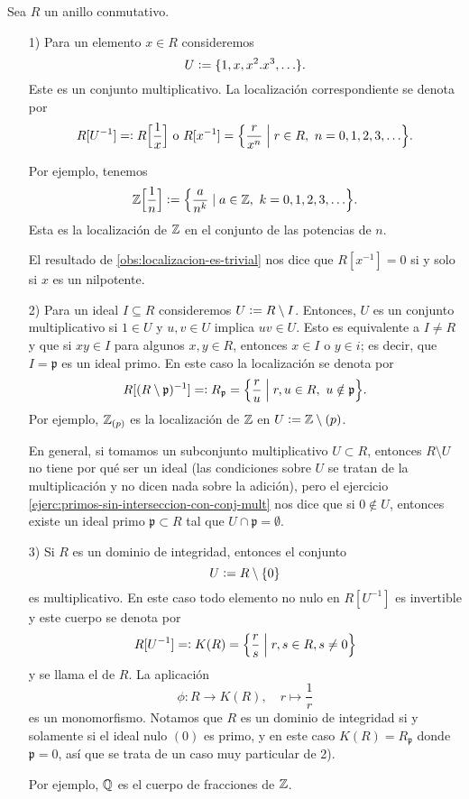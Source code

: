 \begin{ejemplo}
  Sea $R$ un anillo conmutativo.

  \begin{enumerate}
  \item[1)] Para un elemento $x\in R$ consideremos
    $$U \mathrel{\mathop:}= \{ 1,x,x^2.x^3, \ldots \}.$$
    Este es un conjunto multiplicativo. La localización correspondiente se
    denota por
    \[ R [U^{-1}] =\mathrel{\mathop:} R \Bigl[\frac{1}{x}\Bigr]\text{ o }R [x^{-1}] =
       \Bigl\{ \frac{r}{x^n} \Bigm| r\in R, ~ n = 0,1,2,3,\ldots \Bigr\}. \]

    Por ejemplo, tenemos
    \[ \mathbb{Z} \Bigl[\frac{1}{n}\Bigr] \mathrel{\mathop:}=
       \Bigl \{ \frac{a}{n^k} \mid a\in \mathbb{Z}, ~ k = 0,1,2,3,\ldots \Bigr\}. \]
    Esta es la localización de $\mathbb{Z}$ en el conjunto de las potencias de $n$.

    El resultado de \ref{obs:localizacion-es-trivial} nos dice que
    $R [x^{-1}] = 0$ si y solo si $x$ es un nilpotente.

  \item[2)] Para un ideal $I \subseteq R$ consideremos $U \mathrel{\mathop:}= R\setminus
    I$. Entonces, $U$ es un conjunto multiplicativo si $1 \in U$ y $u, v \in U$
    implica $uv\in U$. Esto es equivalente a $I \ne R$ y que si $xy \in I$ para
    algunos $x,y\in R$, entonces $x\in I$ o $y\in i$; es decir, que
    $I = \mathfrak{p}$ es un ideal primo. En este caso la localización se denota
    por
    \[ R [(R\setminus\mathfrak{p})^{-1}] =\mathrel{\mathop:} R_\mathfrak{p} =
       \Bigl\{ \frac{r}{u} \Bigm| r,u\in R, ~ u\notin \mathfrak{p} \Bigr\}. \]
    Por ejemplo, $\mathbb{Z}_{(p)}$ es la localización de $\mathbb{Z}$ en
    $U \mathrel{\mathop:}= \mathbb{Z}\setminus (p)$.

    En general, si tomamos un subconjunto multiplicativo $U \subset R$, entonces
    $R\setminus U$ no tiene por qué ser un ideal (las condiciones sobre $U$ se
    tratan de la multiplicación y no dicen nada sobre la adición), pero el
    ejercicio \ref{ejerc:primos-sin-interseccion-con-conj-mult} nos dice que si
    $0 \notin U$, entonces existe un ideal primo $\mathfrak{p} \subset R$ tal
    que $U \cap \mathfrak{p} = \emptyset$.

  \item[3)] Si $R$ es un dominio de integridad, entonces el conjunto
    $$U \mathrel{\mathop:}= R\setminus \{ 0 \}$$
    es multiplicativo. En este caso todo elemento no nulo en $R [U^{-1}]$ es
    invertible y este cuerpo se denota por
    $$R [U^{-1}] =\mathrel{\mathop:} K (R) = \Bigl\{ \frac{r}{s} \Bigm| r,s\in R, s\ne 0 \Bigr\}$$
    y se llama el  de
    $R$. La aplicación
    $$\phi\colon R \to K (R), \quad r \mapsto \frac{1}{r}$$
    es un monomorfismo. Notamos que $R$ es un dominio de integridad si y
    solamente si el ideal nulo $(0)$ es primo, y en este caso
    $K (R) = R_\mathfrak{p}$ donde $\mathfrak{p} = 0$, así que se trata de
    un caso muy particular de 2).

    Por ejemplo, $\mathbb{Q}$ es el cuerpo de fracciones de $\mathbb{Z}$. \qedhere
  \end{enumerate}
\end{ejemplo}

